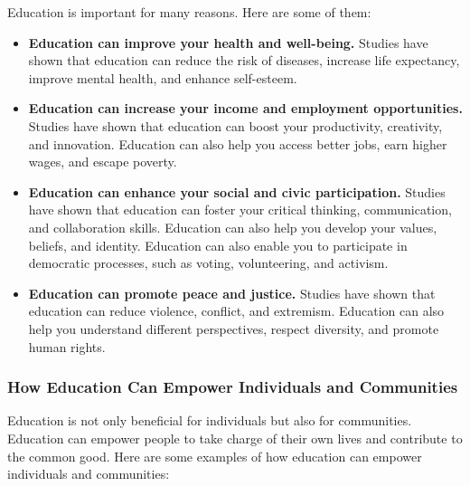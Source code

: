 \documentclass[a4paper,11pt]{article}
\begin{document}
Education is important for many reasons. Here are some of them:

\begin{itemize}
	\item \textbf{Education can improve your health and well-being.}
	 Studies have shown that education can reduce the risk of diseases, increase life expectancy, improve mental health, and enhance self-esteem.
	\item \textbf{Education can increase your income and employment opportunities.} 
	 Studies have shown that education can boost your productivity, creativity, and innovation. Education can also help you access better jobs, earn higher wages, and escape poverty.
	\item \textbf{Education can enhance your social and civic participation.} 
	 Studies have shown that education can foster your critical thinking, communication, and collaboration skills. Education can also help you develop your values, beliefs, and identity. Education can also enable you to participate in democratic processes, such as voting, volunteering, and activism.
	\item \textbf{Education can promote peace and justice.}
	 Studies have shown that education can reduce violence, conflict, and extremism. Education can also help you understand different perspectives, respect diversity, and promote human rights.
\end{itemize}

\subsubsection{How Education Can Empower Individuals and Communities}

Education is not only beneficial for individuals but also for communities. Education can empower people to take charge of their own lives and contribute to the common good. Here are some examples of how education can empower individuals and communities:
\end{document}
